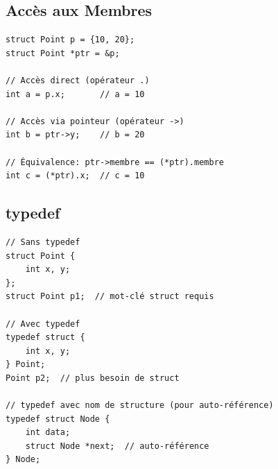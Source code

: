 \documentclass[10pt,a4paper]{article}
\begin{document}
\subsection{Accès aux Membres}

\begin{lstlisting}
struct Point p = {10, 20};
struct Point *ptr = &p;

// Accès direct (opérateur .)
int a = p.x;       // a = 10

// Accès via pointeur (opérateur ->)
int b = ptr->y;    // b = 20

// Équivalence: ptr->membre == (*ptr).membre
int c = (*ptr).x;  // c = 10
\end{lstlisting}

\begin{center}
\end{center}

\subsection{typedef}

\begin{lstlisting}
// Sans typedef
struct Point {
    int x, y;
};
struct Point p1;  // mot-clé struct requis

// Avec typedef
typedef struct {
    int x, y;
} Point;
Point p2;  // plus besoin de struct

// typedef avec nom de structure (pour auto-référence)
typedef struct Node {
    int data;
    struct Node *next;  // auto-référence
} Node;
\end{lstlisting}
\end{document}
